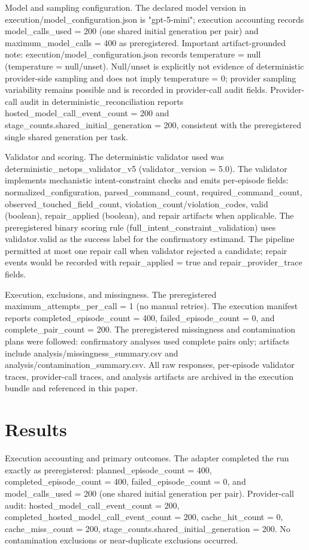 \documentclass[conference]{IEEEtran}
\begin{document}
Model and sampling configuration. The declared model version in execution/model\_configuration.json is "gpt-5-mini"; execution accounting records model\_calls\_used = 200 (one shared initial generation per pair) and maximum\_model\_calls = 400 as preregistered. Important artifact-grounded note: execution/model\_configuration.json records temperature = null (temperature = null/unset). Null/unset is explicitly not evidence of deterministic provider-side sampling and does not imply temperature = 0; provider sampling variability remains possible and is recorded in provider-call audit fields. Provider-call audit in deterministic\_reconciliation reports hosted\_model\_call\_event\_count = 200 and stage\_counts.shared\_initial\_generation = 200, consistent with the preregistered single shared generation per task.

Validator and scoring. The deterministic validator used was deterministic\_netops\_validator\_v5 (validator\_version = 5.0). The validator implements mechanistic intent-constraint checks and emits per-episode fields: normalized\_configuration, parsed\_command\_count, required\_command\_count, observed\_touched\_field\_count, violation\_count/violation\_codes, valid (boolean), repair\_applied (boolean), and repair artifacts when applicable. The preregistered binary scoring rule (full\_intent\_constraint\_validation) uses validator.valid as the success label for the confirmatory estimand. The pipeline permitted at most one repair call when validator rejected a candidate; repair events would be recorded with repair\_applied = true and repair\_provider\_trace fields.

Execution, exclusions, and missingness. The preregistered maximum\_attempts\_per\_call = 1 (no manual retries). The execution manifest reports completed\_episode\_count = 400, failed\_episode\_count = 0, and complete\_pair\_count = 200. The preregistered missingness and contamination plans were followed: confirmatory analyses used complete pairs only; artifacts include analysis/missingness\_summary.csv and analysis/contamination\_summary.csv. All raw responses, per-episode validator traces, provider-call traces, and analysis artifacts are archived in the execution bundle and referenced in this paper.

\section{Results}
Execution accounting and primary outcomes. The adapter completed the run exactly as preregistered: planned\_episode\_count = 400, completed\_episode\_count = 400, failed\_episode\_count = 0, and model\_calls\_used = 200 (one shared initial generation per pair). Provider-call audit: hosted\_model\_call\_event\_count = 200, completed\_hosted\_model\_call\_event\_count = 200, cache\_hit\_count = 0, cache\_miss\_count = 200, stage\_counts.shared\_initial\_generation = 200. No contamination exclusions or near-duplicate exclusions occurred.
\end{document}
